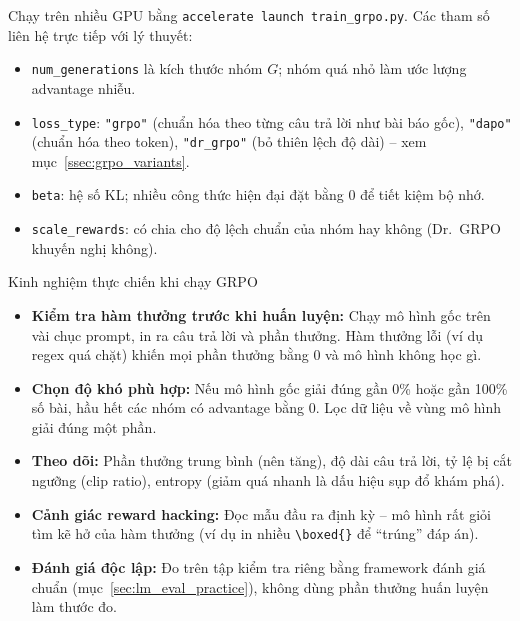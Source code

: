 Chạy trên nhiều GPU bằng \texttt{accelerate launch train\_grpo.py}. Các tham số liên hệ trực tiếp với lý thuyết:
\begin{itemize}
	\item \texttt{num\_generations} là kích thước nhóm $G$; nhóm quá nhỏ làm ước lượng advantage nhiễu.
	\item \texttt{loss\_type}: \texttt{"grpo"} (chuẩn hóa theo từng câu trả lời như bài báo gốc), \texttt{"dapo"} (chuẩn hóa theo token), \texttt{"dr\_grpo"} (bỏ thiên lệch độ dài) -- xem mục~\ref{ssec:grpo_variants}.
	\item \texttt{beta}: hệ số KL; nhiều công thức hiện đại đặt bằng 0 để tiết kiệm bộ nhớ.
	\item \texttt{scale\_rewards}: có chia cho độ lệch chuẩn của nhóm hay không (Dr.~GRPO khuyến nghị không).
\end{itemize}

\begin{pitfall}{Kinh nghiệm thực chiến khi chạy GRPO}
\begin{itemize}
	\item \textbf{Kiểm tra hàm thưởng trước khi huấn luyện:} Chạy mô hình gốc trên vài chục prompt, in ra câu trả lời và phần thưởng. Hàm thưởng lỗi (ví dụ regex quá chặt) khiến mọi phần thưởng bằng 0 và mô hình không học gì.
	\item \textbf{Chọn độ khó phù hợp:} Nếu mô hình gốc giải đúng gần 0\% hoặc gần 100\% số bài, hầu hết các nhóm có advantage bằng 0. Lọc dữ liệu về vùng mô hình giải đúng một phần.
	\item \textbf{Theo dõi:} Phần thưởng trung bình (nên tăng), độ dài câu trả lời, tỷ lệ bị cắt ngưỡng (clip ratio), entropy (giảm quá nhanh là dấu hiệu sụp đổ khám phá).
	\item \textbf{Cảnh giác reward hacking:} Đọc mẫu đầu ra định kỳ -- mô hình rất giỏi tìm kẽ hở của hàm thưởng (ví dụ in nhiều \texttt{\textbackslash boxed\{\}} để “trúng” đáp án).
	\item \textbf{Đánh giá độc lập:} Đo trên tập kiểm tra riêng bằng framework đánh giá chuẩn (mục~\ref{sec:lm_eval_practice}), không dùng phần thưởng huấn luyện làm thước đo.
\end{itemize}
\end{pitfall}
